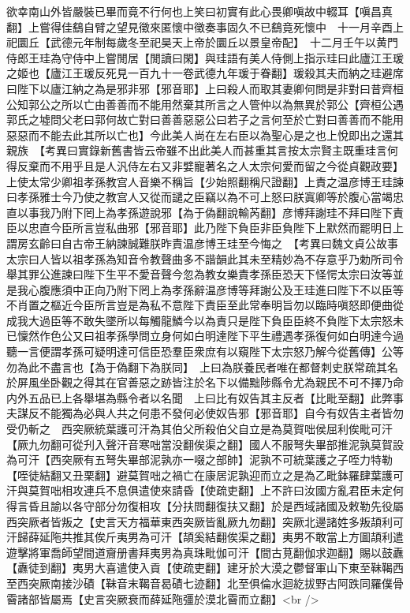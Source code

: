 欲幸南山外皆嚴裝已畢而竟不行何也上笑曰初實有此心畏卿嗔故中輟耳【嗔昌真翻】上嘗得佳鷂自臂之望見徵來匿懷中徵奏事固久不已鷂竟死懷中　十一月辛酉上祀圜丘【武德元年制每歲冬至祀昊天上帝於圜丘以景皇帝配】　十二月壬午以黄門侍郎王珪為守侍中上嘗閒居【閒讀曰閑】與珪語有美人侍側上指示珪曰此廬江王瑗之姬也【廬江王瑗反死見一百九十一卷武德九年瑗于眷翻】瑗殺其夫而納之珪避席曰陛下以廬江納之為是邪非邪【邪音耶】上曰殺人而取其妻卿何問是非對曰昔齊桓公知郭公之所以亡由善善而不能用然棄其所言之人管仲以為無異於郭公【齊桓公遇郭氏之墟問父老曰郭何故亡對曰善善惡惡公曰若子之言何至於亡對曰善善而不能用惡惡而不能去此其所以亡也】今此美人尚在左右臣以為聖心是之也上悅即出之還其親族　【考異曰實錄新舊書皆云帝雖不出此美人而甚重其言按太宗賢主既重珪言何得反棄而不用乎且是人汎侍左右又非嬖寵著名之人太宗何愛而留之今從貞觀政要】上使太常少卿祖孝孫教宫人音樂不稱旨【少始照翻稱尺證翻】上責之温彦博王珪諫曰孝孫雅士今乃使之教宫人又從而譴之臣竊以為不可上怒曰朕寘卿等於腹心當竭忠直以事我乃附下罔上為孝孫遊說邪【為于偽翻說輸芮翻】彦博拜謝珪不拜曰陛下責臣以忠直今臣所言豈私曲邪【邪音耶】此乃陛下負臣非臣負陛下上默然而罷明日上謂房玄齡曰自古帝王納諫誠難朕昨責温彦博王珪至今悔之　【考異曰魏文貞公故事太宗曰人皆以祖孝孫為知音令教聲曲多不諧韻此其未至精妙為不存意乎乃勅所司令舉其罪公進諫曰陛下生平不愛音聲今忽為教女樂責孝孫臣恐天下怪愕太宗曰汝等並是我心腹應須中正向乃附下罔上為孝孫辭温彦博等拜謝公及王珪進曰陛下不以臣等不肖置之樞近今臣所言豈是為私不意陛下責臣至此常奉明旨勿以臨時嗔怒即便曲從成我大過臣等不敢失墜所以每觸龍鱗今以為責只是陛下負臣臣終不負陛下太宗怒未已懍然作色公又曰祖孝孫學問立身何如白明達陛下平生禮遇孝孫復何如白明達今過聽一言便謂孝孫可疑明達可信臣恐羣臣衆庶有以窺陛下太宗怒乃解今從舊傳】公等勿為此不盡言也【為于偽翻下為朕同】　上曰為朕養民者唯在都督刺史朕常疏其名於屏風坐卧觀之得其在官善惡之跡皆注於名下以備黜陟縣令尤為親民不可不擇乃命内外五品已上各舉堪為縣令者以名聞　上曰比有奴告其主反者【比毗至翻】此弊事夫謀反不能獨為必與人共之何患不發何必使奴告邪【邪音耶】自今有奴告主者皆勿受仍斬之　西突厥統葉護可汗為其伯父所殺伯父自立是為莫賀咄侯屈利俟毗可汗【厥九勿翻可從刋入聲汗音寒咄當没翻俟渠之翻】國人不服弩失畢部推泥孰莫賀設為可汗【西突厥有五弩失畢部泥孰亦一啜之部帥】泥孰不可統葉護之子咥力特勒【咥徒結翻又丑栗翻】避莫賀咄之禍亡在康居泥孰迎而立之是為乙毗鉢羅肆葉護可汗與莫賀咄相攻連兵不息俱遣使來請昏【使疏吏翻】上不許曰汝國方亂君臣未定何得言昏且諭以各守部分勿復相攻【分扶問翻復扶又翻】於是西域諸國及敕勒先役屬西突厥者皆叛之【史言天方福華東西突厥皆亂厥九勿翻】突厥北邊諸姓多叛頡利可汗歸薛延陁共推其俟斤夷男為可汗【頡奚結翻俟渠之翻】夷男不敢當上方圖頡利遣遊擊將軍喬師望間道齎册書拜夷男為真珠毗伽可汗【間古莧翻伽求迦翻】賜以鼓纛【纛徒到翻】夷男大喜遣使入貢【使疏吏翻】建牙於大漠之鬱督軍山下東至靺鞨西至西突厥南接沙磧【靺音末鞨音曷磧七迹翻】北至俱倫水迴紇拔野古阿跌同羅僕骨霫諸部皆屬焉【史言突厥衰而薛延陁彊於漠北霫而立翻】<br />
